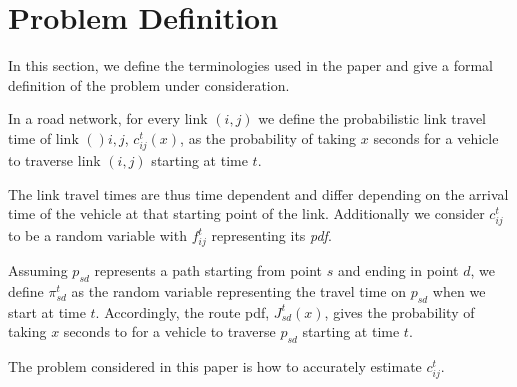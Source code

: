 \section{Problem Definition}
\label{sec:problemdef}
In this section, we define the terminologies used in the paper and give a formal definition of the problem under consideration.

\begin{definition} 
In a road network, for every link $(i, j)$ we define the probabilistic link travel time of link $()i,j$, $c_{ij}^t(x)$, as the probability of taking $x$ seconds for a vehicle to traverse link $(i,j)$ starting at time $t$.
\end{definition}

The link travel times are thus time dependent and differ depending on the arrival time of the vehicle at that starting point of the link. Additionally we consider $c_{ij}^t$ to be a random variable with $f_{ij}^t$ representing its \textit{pdf}.

\begin{definition} 
Assuming $p_{sd}$ represents a path starting from point $s$ and ending in point $d$, we define $\pi_{sd}^t$ as the random variable representing the travel time on $p_{sd}$ when we start at time $t$. Accordingly, the route pdf, $J_{sd}^t(x)$, gives the probability of taking $x$ seconds to for a vehicle to traverse $p_{sd}$ starting at time $t$.
\end{definition}

The problem considered in this paper is how to  accurately estimate $c_{ij}^t$.


